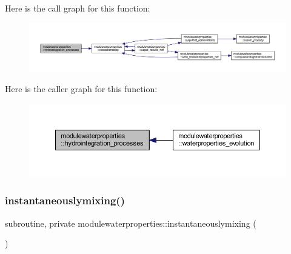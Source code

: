 Here is the call graph for this function\+:\nopagebreak
\begin{figure}[H]
\begin{center}
\leavevmode
\includegraphics[width=350pt]{namespacemodulewaterproperties_a9766d3375543a27f75f30630ffe87795_cgraph}
\end{center}
\end{figure}
Here is the caller graph for this function\+:\nopagebreak
\begin{figure}[H]
\begin{center}
\leavevmode
\includegraphics[width=350pt]{namespacemodulewaterproperties_a9766d3375543a27f75f30630ffe87795_icgraph}
\end{center}
\end{figure}
\mbox{\label{namespacemodulewaterproperties_ac2912c1f90322adb405cc7d8f1d67898}} 
\subsubsection{\texorpdfstring{instantaneouslymixing()}{instantaneouslymixing()}}
{\footnotesize\ttfamily subroutine, private modulewaterproperties\+::instantaneouslymixing (\begin{DoxyParamCaption}{ }\end{DoxyParamCaption})\hspace{0.3cm}{\ttfamily [private]}}

